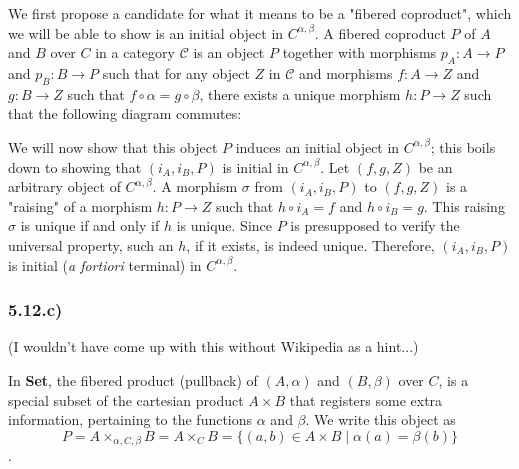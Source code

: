 We first propose a candidate for what it means to be a "fibered coproduct", which we will be able to show is an initial object in $C^{\alpha,\beta}$. A fibered coproduct $P$ of $A$ and $B$ over $C$ in a category $\mathcal{C}$ is an object $P$ together with morphisms $p_A : A \to P$ and $p_B : B \to P$ such that for any object $Z$ in $\mathcal{C}$ and morphisms $f : A \to Z$ and $g : B \to Z$ such that $f \circ \alpha = g \circ \beta$, there exists a unique morphism $h : P \to Z$ such that the following diagram commutes:


We will now show that this object $P$ induces an initial object in $C^{\alpha,\beta}$; this boils down to showing that $(i_A, i_B, P)$ is initial in $C^{\alpha,\beta}$. Let $(f, g, Z)$ be an arbitrary object of $C^{\alpha,\beta}$. A morphism $\sigma$ from $(i_A, i_B, P)$ to $(f, g, Z)$ is a "raising" of a morphism $h : P \to Z$ such that $h \circ i_A = f$ and $h \circ i_B = g$. This raising $\sigma$ is unique if and only if $h$ is unique. Since $P$ is presupposed to verify the universal property, such an $h$, if it exists, is indeed unique. Therefore, $(i_A, i_B, P)$ is initial (\textit{a fortiori} terminal) in $C^{\alpha,\beta}$.


\subsubsection*{5.12.c)}

(I wouldn't have come up with this without Wikipedia as a hint...)

In \textbf{Set}, the fibered product (pullback) of $(A, \alpha)$ and $(B, \beta)$ over $C$, is a special subset of the cartesian product $A \times B$ that registers some extra information, pertaining to the functions $\alpha$ and $\beta$. We write this object as $$P = A \times_{\alpha, C, \beta} B = A \times_C B = \{ (a,b) \in A \times B \mid \alpha(a) = \beta(b) \}$$.

